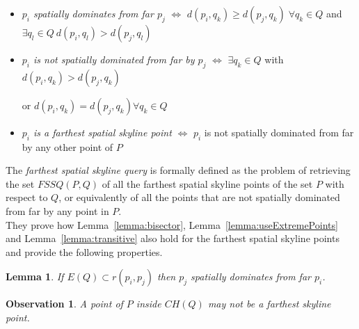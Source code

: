 \documentclass[11pt,onecolumn]{elsart3p}
\newtheorem{lemma}{Lemma}
\newtheorem{observation}{Observation}
\begin{document}
         \begin{itemize}
            \item {\it $p_i$ spatially dominates from far $p_j$} $\iff$ $d(p_i, q_k) \ge d(p_j, q_k) \; \forall q_k\in Q$ and $ \exists q_l\in Q \ d(p_i, q_l) > d(p_j, q_l)$ \vspace{0.6em}%
            \item {\it $p_i$ is not spatially dominated from far by $p_j$} $\iff$ $\exists q_k\in Q$ with $d(p_i, q_k) > d(p_j, q_k)$
            \begin{flushright}
                 {or $d(p_i, q_k) = d(p_j, q_k) \forall q_k \in Q$ \hspace{0.2\linewidth }\vspace{0.6em}}
                   \end{flushright}%
            \item {\it $p_i$ is a farthest spatial skyline point} $\iff$ $p_i$ is not spatially dominated from far by any other point of $P$\vspace{0.6em}
        \end{itemize}

         The {\it farthest spatial skyline query} is formally defined as the problem of retrieving the set $FSSQ(P,Q)$ of all the farthest spatial skyline points of the set $P$  with respect to $Q$, or equivalently of all the points that are not spatially dominated from far by any point in $P$. \\


        They prove how Lemma~\ref{lemma:bisector}, Lemma~\ref{lemma:useExtremePoints} and Lemma~\ref{lemma:transitive} also hold for the farthest spatial skyline points and provide the following properties.
        \vspace{1em}


        \begin{lemma} If $E(Q) \subset r(p_i, p_j)$ then $p_j$ spatially dominates from far $p_i$. \label{lemma:FIntHalfSpaceCH} \end{lemma} \vspace{0.6em}

        \begin{observation} A point of $P$ inside $CH(Q)$ may not be a farthest skyline point. \label{lemma:FInsideCH} \end{observation} \vspace{0.6em}
\end{document}
